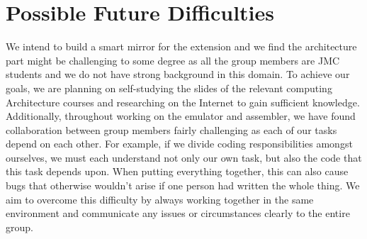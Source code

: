 \documentclass[11pt]{article}
\begin{document}
\section{Possible Future Difficulties}
We intend to build a smart mirror for the extension and we find the architecture part might be challenging to some degree as all the group members are JMC students and we do not have strong background in this domain. To achieve our goals, we are planning on self-studying the slides of the relevant computing Architecture courses and researching on the Internet to gain sufficient knowledge. Additionally, throughout working on the emulator and assembler, we have found collaboration between group members fairly challenging as each of our tasks depend on each other. For example, if we divide coding responsibilities amongst ourselves, we must each understand not only our own task, but also the code that this task depends upon. When putting everything together, this can also cause bugs that otherwise wouldn't arise if one person had written the whole thing. We aim to overcome this difficulty by always working together in the same environment and communicate any issues or circumstances clearly to the entire group.
\end{document}
